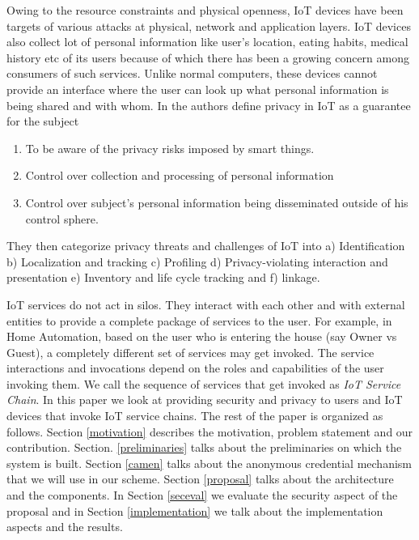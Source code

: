 \documentclass[journal]{IEEEtran}
\begin{document}
Owing to the resource constraints and physical openness, IoT devices have been targets of various attacks \cite{iot-sec} at physical, network and application layers. IoT devices also collect lot of personal information like user's location, eating habits, medical history etc of its users because of which there has been a growing concern among consumers of such services. Unlike normal computers, these devices cannot provide an interface where the user can look up what personal information is being shared and with whom. In \cite{Ziegeldorf2014PrivacyIT} the authors define privacy in IoT as a guarantee for the subject	

\begin{enumerate}[label=\alph*)]
	\item To be aware of the privacy risks imposed by smart things.
	\item Control over collection and processing of personal information
	\item Control over subject's personal information being disseminated outside of his control sphere.
\end{enumerate}
They then categorize privacy threats and challenges of IoT into a) Identification b) Localization and tracking c) Profiling d) Privacy-violating interaction and presentation e) Inventory and life cycle tracking and f) linkage.

IoT services do not act in silos. They interact with each other and with external entities to provide a complete package of services to the user. For example, in Home Automation, based on the user who is entering the house (say Owner vs Guest), a completely different set of services may get invoked. The service interactions and invocations depend on the roles and capabilities of the user invoking them. We call the sequence of services that get invoked as \textit{IoT Service Chain}. In this paper we look at providing security and privacy to users and IoT devices that invoke IoT service chains. The rest of the paper is organized as follows. Section \ref{motivation} describes the motivation, problem statement and our contribution. Section. \ref{preliminaries} talks about the preliminaries on which the system is built. Section \ref{camen} talks about the anonymous credential mechanism that we will use in our scheme. Section \ref{proposal} talks about the architecture and the components. In Section \ref{seceval} we evaluate the security aspect of the proposal and in Section \ref{implementation} we talk about the implementation aspects and the results.
\end{document}
